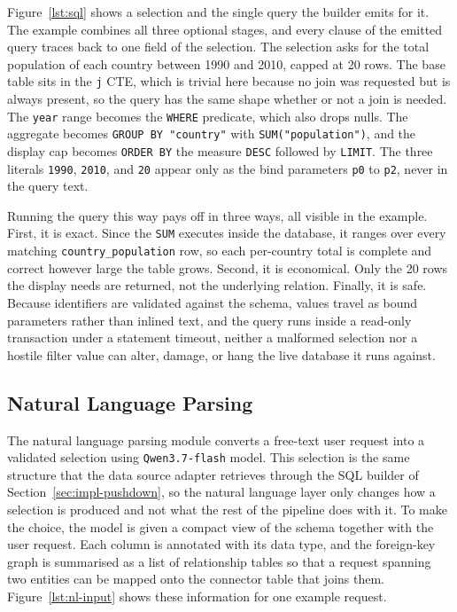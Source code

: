 Figure~\ref{lst:sql} shows a selection and the single query the builder emits for it. The example combines all three optional stages, and every clause of the emitted query traces back to one field of the selection. The selection asks for the total population of each country between 1990 and 2010, capped at 20 rows. The base table sits in the \texttt{j} CTE, which is trivial here because no join was requested but is always present, so the query has the same shape whether or not a join is needed. The \texttt{year} range becomes the \texttt{WHERE} predicate, which also drops nulls. The aggregate becomes \texttt{GROUP BY "country"} with \texttt{SUM("population")}, and the display cap becomes \texttt{ORDER BY} the measure \texttt{DESC} followed by \texttt{LIMIT}. The three literals \texttt{1990}, \texttt{2010}, and \texttt{20} appear only as the bind parameters \texttt{p0} to \texttt{p2}, never in the query text.

Running the query this way pays off in three ways, all visible in the example. First, it is exact. Since the \texttt{SUM} executes inside the database, it ranges over every matching \texttt{country\_population} row, so each per-country total is complete and correct however large the table grows. Second, it is economical. Only the 20 rows the display needs are returned, not the underlying relation. Finally, it is safe. Because identifiers are validated against the schema, values travel as bound parameters rather than inlined text, and the query runs inside a read-only transaction under a statement timeout, neither a malformed selection nor a hostile filter value can alter, damage, or hang the live database it runs against.

\subsection{Natural Language Parsing}
The natural language parsing module converts a free-text user request into a validated selection  using \texttt{Qwen3.7-flash} model. This selection is the same structure that the data source adapter retrieves through the SQL builder of Section~\ref{sec:impl-pushdown}, so the natural language layer only changes how a selection is produced and not what the rest of the pipeline does with it. To make the choice, the model is given a compact view of the schema together with the user request. Each column is annotated with its data type, and the foreign-key graph is summarised as a list of relationship tables so that a request spanning two entities can be mapped onto the connector table that joins them. Figure~\ref{lst:nl-input} shows these information for one example request.

